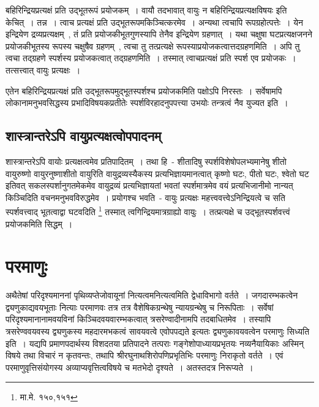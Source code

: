 		बहिरिन्द्रियप्रत्यक्षं प्रति उद्भूतरूपं प्रयोजकम्~। वायौ तदभावात् वायुः‌ न बहिरिन्द्रियप्रत्यक्षविषयः‌ इति केचित्~। तन्न~। त्वाच प्रत्यक्षं प्रति उद्भूतरूपमकिञ्चित्करमेव~। अन्यथा त्वचापि रूपग्रहोत्पत्तेः~। येन इन्द्रियेण द्रव्यप्रत्यक्षम्~, तं प्रति प्रयोजकीभूतगुणस्यापि तेनैव इन्द्रियेण ग्रहणात्~। यथा चक्षुषा घटप्रत्यक्षजनने प्रयोजकीभूतस्य रूपस्य चक्षुषैव ग्रहणम्~, त्वचा तु तत्प्रत्यक्षे रूपस्याप्रयोजकत्वात्तदग्रहणमिति~। अपि तु त्वचा तद्ग्रहणे स्पर्शस्य प्रयोजकत्वात् तद्ग्रहणमिति~। तस्मात् त्वाचप्रत्यक्षं प्रति स्पर्श एव प्रयोजकः~। तत्सत्त्वात् वायुः प्रत्यक्षः‌~।

		एतेन बहिरिन्द्रियप्रत्यक्षं प्रति उद्भूतरूपमुद्भूतस्पर्शश्च प्रयोजकमिति पक्षोऽपि निरस्तः~। सर्वेषामपि लोकानामनुभवसिद्धस्य प्रभादिविषयकप्रतीतेः स्पर्शविरहादनुपपत्त्या उभयोः तन्त्रत्वं नैव युज्यत इति~।

		\subsection{शास्त्रान्तरेऽपि वायुप्रत्यक्षत्वोपपादनम्}

		शास्त्रान्तरेऽपि वायोः प्रत्यक्षत्वमेव प्रतिपादितम्~। तथा हि~- {\fontsize{11.7}{0}\selectfont\s शीतादिषु स्पर्शविशेषोपलभ्यमानेषु शीतो वायुरुष्णो वायुरनुष्णाशीतो वायुरिति वायुद्रव्यस्यैकस्य प्रत्यभिज्ञायमानत्वात् कृष्णो घटः, पीतो घटः, श्वेतो घट इतिवत् सकलस्पर्शानुगतमेकमेव वायुद्रव्यं प्रत्यभिज्ञायतां भवतां स्पर्शमात्रमेव वयं प्रत्यभिजानीमो नान्यत् किञ्चिदिति वचनमनुभवविरुद्धमेव~। प्रयोगश्च भवति~- वायुः प्रत्यक्षः महत्त्ववत्त्वेऽनिन्द्रियत्वे च सति स्पर्शवत्त्वाद् भूतत्वाद्वा घटवदिति \footnote{मा.मे. १५०,१५१}} तस्मात् त्वगिन्द्रियमात्रग्राह्यो वायुः~। तत्प्रत्यक्षे च उद्भूतस्पर्शवत्त्वं प्रयोजकमिति सिद्धम्~।



	\section{परमाणुः}

	अथैतेषां परिदृश्यमाननां पृथिव्यप्तेजोवायूनां नित्यत्वमनित्यत्वमिति द्वेधाविभागो वर्तते~। जगदारम्भकत्वेन द्व्यणुकाद्यवयभूताः नित्याः परमाणवः तत्र तत्र वैशेषिकग्रन्थेषु न्यायग्रन्थेषु च निरूपिताः~। सर्वेषां परिदृश्यमानानामवयविनां किञ्चिदवयवारम्भकत्वात् त्रसरेण्वादीनामपि तदबाधितमेव~। तस्यापि त्रसरेण्ववयवस्य द्व्यणुकस्य महदारमभकत्वं सावयवत्वे एवोपपद्यते इत्यतः द्व्यणुकावयवत्वेन परमाणुः सिध्यति इति~। यद्यपि प्रमाणपदार्थस्य विशदतया प्रतिपादने तत्पराः गङ्गेशोपाध्यायप्रभृतयः नव्यनैयायिकाः अस्मिन् विषये तथा विचारं न कृतवन्तः, तथापि श्रीरघुनाथशिरोपणिप्रभृतिभिः परमाणुः निराकृतो वर्तते~। एवं परमाणुवृत्तिसंयोगस्य अव्याप्यवृत्तित्वविषये च मतभेदो दृश्यते~। अतस्तदत्र निरूप्यते~।

